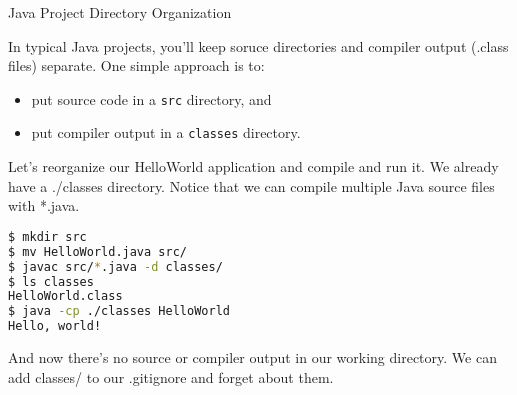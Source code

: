 \documentclass{beamer}
\begin{document}
\begin{frame}[fragile]{Java Project Directory Organization}


In typical Java projects, you'll keep soruce directories and compiler
output (.class files) separate.  One simple approach is to:
\begin{itemize}
\item put source code in a {\tt src} directory, and
\item put compiler output in a {\tt classes} directory.
\end{itemize}

Let's reorganize our HelloWorld application and compile and run it.  We already have a ./classes directory.  Notice that we can compile multiple Java source files with *.java.
\begin{lstlisting}[language=bash]
$ mkdir src
$ mv HelloWorld.java src/
$ javac src/*.java -d classes/
$ ls classes
HelloWorld.class
$ java -cp ./classes HelloWorld
Hello, world!
\end{lstlisting}
\vspace{-.1in}
And now there's no source or compiler output in our working directory.  We can add classes/ to our .gitignore and forget  about them.

\end{frame}















\end{document}
